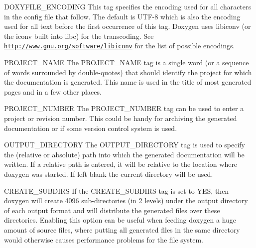 \begin{DoxyDescription}
\item[{\ttfamily DOXYFILE\_\-ENCODING} ] This tag specifies the encoding used for all characters in the config file that follow. The default is UTF-\/8 which is also the encoding used for all text before the first occurrence of this tag. Doxygen uses libiconv (or the iconv built into libc) for the transcoding. See \href{http://www.gnu.org/software/libiconv}{\tt http://www.gnu.org/software/libiconv} for the list of possible encodings.

\label{config_cfg_project_name}
\hypertarget{config_cfg_project_name}{}
 
\item[{\ttfamily PROJECT\_\-NAME} ] The {\ttfamily PROJECT\_\-NAME} tag is a single word (or a sequence of words surrounded by double-\/quotes) that should identify the project for which the documentation is generated. This name is used in the title of most generated pages and in a few other places.

\label{config_cfg_project_number}
\hypertarget{config_cfg_project_number}{}
 
\item[{\ttfamily PROJECT\_\-NUMBER} ] The {\ttfamily PROJECT\_\-NUMBER} tag can be used to enter a project or revision number. This could be handy for archiving the generated documentation or if some version control system is used.

\label{config_cfg_output_directory}
\hypertarget{config_cfg_output_directory}{}
 
\item[{\ttfamily OUTPUT\_\-DIRECTORY} ] The {\ttfamily OUTPUT\_\-DIRECTORY} tag is used to specify the (relative or absolute) path into which the generated documentation will be written. If a relative path is entered, it will be relative to the location where doxygen was started. If left blank the current directory will be used.

\label{config_cfg_create_subdirs}
\hypertarget{config_cfg_create_subdirs}{}
 
\item[{\ttfamily CREATE\_\-SUBDIRS} ] If the {\ttfamily CREATE\_\-SUBDIRS} tag is set to {\ttfamily YES}, then doxygen will create 4096 sub-\/directories (in 2 levels) under the output directory of each output format and will distribute the generated files over these directories. Enabling this option can be useful when feeding doxygen a huge amount of source files, where putting all generated files in the same directory would otherwise causes performance problems for the file system.


\end{DoxyDescription}
